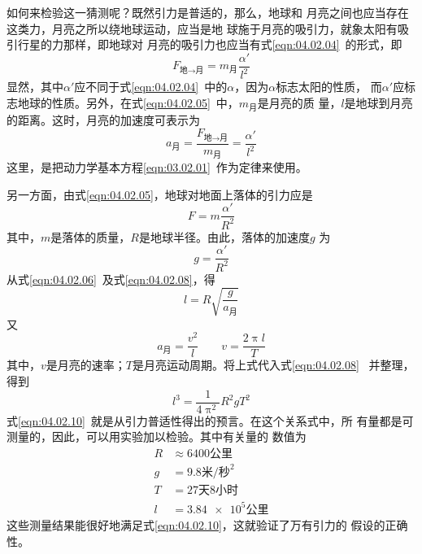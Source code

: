 如何来检验这一猜测呢？既然引力是普适的，那么，地球和
月亮之间也应当存在这类力，月亮之所以绕地球运动，应当是地
球施于月亮的吸引力，就象太阳有吸引行星的力那样，即地球对
月亮的吸引力也应当有式\eqref{eqn:04.02.04}~的形式，即
\begin{equation}\label{eqn:04.02.05}
	F _ { \text{地} \to \text{月}} = m _ {\text{月}} \frac { \alpha ' } { l ^ { 2 } }  
\end{equation}
显然，其中$ \alpha ' $应不同于式\eqref{eqn:04.02.04}~中的$ \alpha $，因为$ \alpha $标志太阳的性质，
而$ \alpha ' $应标志地球的性质。另外，在式\eqref{eqn:04.02.05}~中，$ m _ {\text{月}} $是月亮的质
量，$ l $是地球到月亮的距离。这时，月亮的加速度可表示为
\begin{equation}\label{eqn:04.02.06}
	a _ { \text{月} } = \frac { F _ { \text{地} \to \text{月}} } { m _ {\text{月}} } = \frac { \alpha ' } { l ^ { 2 } }  
\end{equation}
这里，是把动力学基本方程\eqref{eqn:03.02.01}~作为定律来使用。

另一方面，由式\eqref{eqn:04.02.05}，地球对地面上落体的引力应是
\begin{equation}\label{eqn:04.02.07}
	F = m \frac { \alpha ' }  { R ^ { 2 } }  
\end{equation}
其中，$ m $是落体的质量，$ R $是地球半径。由此，落体的加速度$ g $
为
\begin{equation}\label{eqn:04.02.08}
	g = \frac { \alpha ' } { R ^ { 2 } }  
\end{equation}
从式\eqref{eqn:04.02.06}~及式\eqref{eqn:04.02.08}，得
\begin{equation}\label{eqn:04.02.09}
	l = R \sqrt { { \frac { g } { a _ { \text{月} } }} }
\end{equation} 
又
\begin{equation*}
	a _ { \text{月} } = \frac { v ^ { 2 } } { l } \qquad  
v = \frac { 2 \uppi l } { T } 
\end{equation*}
其中，$ v $是月亮的速率；$ T $是月亮运动周期。将上式代入式\eqref{eqn:04.02.08}~
并整理，得到
\begin{equation}\label{eqn:04.02.10}
	l ^ { 3 } = \frac { 1 } { 4 \uppi ^ { 2 } } R ^ { 2 } g T ^ { 2 } 
\end{equation}
式\eqref{eqn:04.02.10}~就是从引力普适性得出的预言。在这个关系式中，所
有量都是可测量的，因此，可以用实验加以检验。其中有关量的
数值为
\begin{align*}
	R &\approx  6400 \text{公里} \\
	g &=  9.8 \text{米/秒} ^ 2 \\
	T &=  27 \text{天}8\text{小时} \\
	l &=  \num{3.84e5} \text{公里}
\end{align*}
这些测量结果能很好地满足式\eqref{eqn:04.02.10}，这就验证了万有引力的
假设的正确性。

